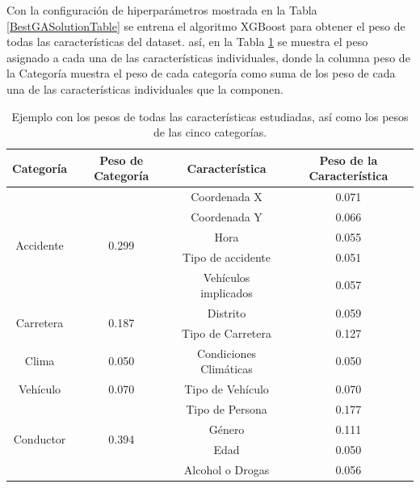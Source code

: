 \documentclass{uathesis-es}
\begin{document}
{%

Con la configuración de hiperparámetros mostrada en la Tabla \ref{BestGASolutionTable} se entrena el algoritmo XGBoost para obtener el peso de todas las  características del dataset. así, en la Tabla \ref{1stPaperWeightsFinalCharacteristics} se muestra el peso asignado a cada una de las características individuales, donde la columna peso de la Categoría muestra el peso de cada categoría como suma de los peso de cada una de las  características individuales que la componen.


\begin{table}[H]
	\centering
	\begin{tabular}{ |c|c|c|c| }
		\hline
		\textbf{Categoría} & \textbf{Peso de Categoría} & \textbf{Característica} & \textbf{Peso de la Característica}\\
		\hline
		\hline
		\multirow{5}{*}{Accidente}   & \multirow{5}{*}{0.299} & Coordenada X & 0.071\\
		&  & Coordenada Y  & 0.066\\
		&  & Hora & 0.055\\
		&  & Tipo de accidente  & 0.051\\
		&  & Vehículos implicados & 0.057\\
		\hline
		\hline
		\multirow{2}{*}{Carretera} & \multirow{2}{*}{0.187} & Distrito  & 0.059\\      
		&  & Tipo de Carretera & 0.127\\
		\hline
		\hline
		\multirow{1}{*}{Clima}  & \multirow{1}{*}{0.050}  & Condiciones Climáticas  & 0.050\\
		\hline
		\hline
		\multirow{1}{*}{Vehículo}  & \multirow{1}{*}{0.070} & Tipo de Vehículo  & 0.070\\
		\hline
		\hline
		\multirow{4}{*}{Conductor}   & \multirow{4}{*}{0.394} & Tipo de Persona & 0.177\\
		&      & Género      & 0.111\\
		&      & Edad      & 0.050\\
		&      & Alcohol o Drogas  & 0.056\\
		\hline
		\hline
	\end{tabular}
	\caption{Ejemplo con los pesos de todas las características estudiadas, así como los pesos de las cinco categorías.}
	\label{1stPaperWeightsFinalCharacteristics}
\end{table}

}
\end{document}
